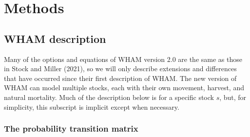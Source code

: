 \documentclass[
]{article}
\begin{document}
\hypertarget{methods}{%
\section*{Methods}\label{methods}}

\hypertarget{wham-description}{%
\subsection*{WHAM description}\label{wham-description}}

Many of the options and equations of WHAM version 2.0 are the same as those in Stock and Miller (2021), so we will only describe extensions and differences that have occurred since their first description of WHAM. The new version of WHAM can model multiple stocks, each with their own movement, harvest, and natural mortality. Much of the description below is for a specific stock \(s\), but, for simplicity, this subscript is implicit except when necessary.

\hypertarget{the-probability-transition-matrix}{%
\subsubsection*{The probability transition matrix}\label{the-probability-transition-matrix}}
\end{document}
